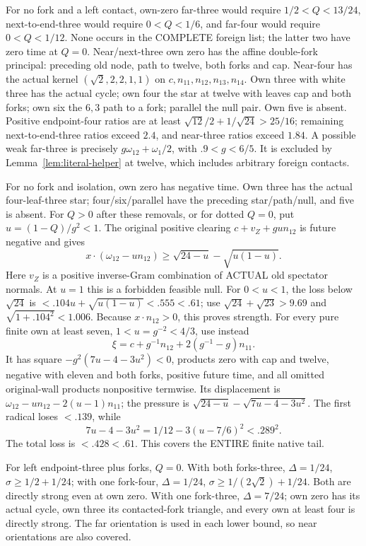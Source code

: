 For no fork and a left contact, own-zero far-three
would require \(1/2<Q<13/24\), next-to-end-three
would require \(0<Q<1/6\), and far-four would
require \(0<Q<1/12\).
None occurs in the COMPLETE foreign list; the latter
two have zero time at \(Q=0\).
Near/next-three own zero has the affine double-fork
principal: preceding old node, path to twelve,
both forks and cap.
Near-four has the actual kernel
\((\sqrt2,2,2,1,1)\) on
\(c,n_{11},n_{12},n_{13},n_{14}\).
Own three with white three has the actual cycle;
own four the star at twelve with leaves cap and
both forks; own six the \(6,3\) path to a fork;
parallel the null pair.
Own five is absent.
Positive endpoint-four ratios are at least
\(\sqrt{12}/2+1/\sqrt{24}>25/16\);
remaining next-to-end-three ratios exceed \(2.4\),
and near-three ratios exceed \(1.84\).
A possible weak far-three is precisely
\(g\omega_{12}+\omega_1/2\), with
\(.9<g<6/5\).
It is excluded by Lemma~\ref{lem:literal-helper}
at twelve, which includes arbitrary foreign contacts.

For no fork and isolation, own zero has negative time.
Own three has the actual four-leaf-three star;
four/six/parallel have the preceding star/path/null,
and five is absent.
For \(Q>0\) after these removals, or for dotted
\(Q=0\), put \(u=(1-Q)/g^2<1\).
The original positive clearing
\(c+v_Z+gu n_{12}\) is future negative and gives
\[
 x\cdot(\omega_{12}-un_{12})
                \ge\sqrt{24-u}-\sqrt{u(1-u)} .
\]
Here \(v_Z\) is a positive inverse-Gram combination
of ACTUAL old spectator normals.
At \(u=1\) this is a forbidden feasible null.
For \(0<u<1\), the loss below \(\sqrt{24}\) is
\(<.104u+\sqrt{u(1-u)}<.555<.61\);
use \(\sqrt{24}+\sqrt{23}>9.69\) and
\(\sqrt{1+.104^2}<1.006\).
Because \(x\cdot n_{12}>0\), this proves strength.
For every pure finite own at least seven,
\(1<u=g^{-2}<4/3\), use instead
\[
              \xi=c+g^{-1}n_{12}+2(g^{-1}-g)n_{11}.
\]
It has square \(-g^2(7u-4-3u^2)<0\), products zero
with cap and twelve, negative with eleven and both
forks, positive future time, and all omitted
original-wall products nonpositive termwise.
Its displacement is
\(\omega_{12}-un_{12}-2(u-1)n_{11}\);
the pressure is
\(\sqrt{24-u}-\sqrt{7u-4-3u^2}\).
The first radical loses \(<.139\), while
\[
              7u-4-3u^2=1/12-3(u-7/6)^2<.289^2 .
\]
The total loss is \(<.428<.61\).
This covers the ENTIRE finite native tail.

For left endpoint-three plus forks, \(Q=0\).
With both forks-three,
\(\Delta=1/24\), \(\sigma\ge1/2+1/24\);
with one fork-four,
\(\Delta=1/24\), \(\sigma\ge1/(2\sqrt2)+1/24\).
Both are directly strong even at own zero.
With one fork-three,
\(\Delta=7/24\); own zero has its actual cycle,
own three its contacted-fork triangle,
and every own at least four is directly strong.
The far orientation is used in each lower bound,
so near orientations are also covered.

